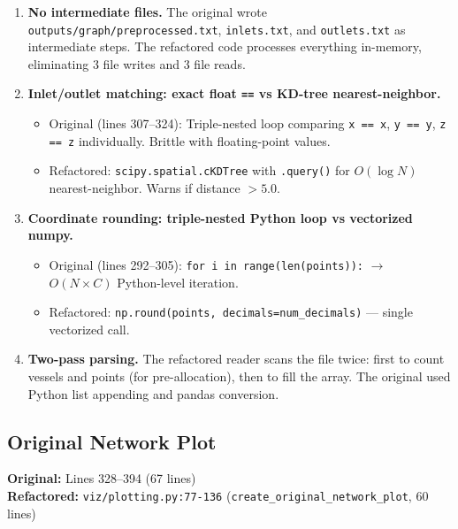 \documentclass[11pt,letterpaper]{article}
\newcommand{\code}[1]{\texttt{#1}}
\begin{document}
\begin{enumerate}
    \item \textbf{No intermediate files.} The original wrote \code{outputs/graph/preprocessed.txt}, \code{inlets.txt}, and \code{outlets.txt} as intermediate steps. The refactored code processes everything in-memory, eliminating 3 file writes and 3 file reads.

    \item \textbf{Inlet/outlet matching: exact float \code{==} vs KD-tree nearest-neighbor.}
    \begin{itemize}
        \item Original (lines 307--324): Triple-nested loop comparing \code{x == x}, \code{y == y}, \code{z == z} individually. Brittle with floating-point values.
        \item Refactored: \code{scipy.spatial.cKDTree} with \code{.query()} for $O(\log N)$ nearest-neighbor. Warns if distance $> 5.0$.
    \end{itemize}

    \item \textbf{Coordinate rounding: triple-nested Python loop vs vectorized numpy.}
    \begin{itemize}
        \item Original (lines 292--305): \code{for i in range(len(points)):} $\to$ $O(N \times C)$ Python-level iteration.
        \item Refactored: \code{np.round(points, decimals=num\_decimals)} --- single vectorized call.
    \end{itemize}

    \item \textbf{Two-pass parsing.} The refactored reader scans the file twice: first to count vessels and points (for pre-allocation), then to fill the array. The original used Python list appending and pandas conversion.
\end{enumerate}

\subsection{Original Network Plot}

\textbf{Original:} Lines 328--394 (67 lines)\\
\textbf{Refactored:} \code{viz/plotting.py:77-136} (\code{create\_original\_network\_plot}, 60 lines)
\end{document}

